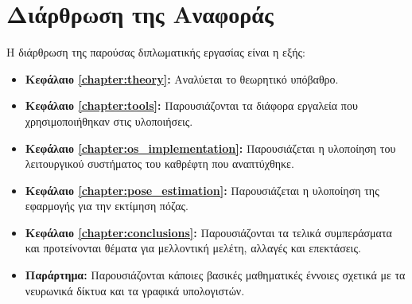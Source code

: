 \section{Διάρθρωση της Αναφοράς}
\label{section:layout}

Η διάρθρωση της παρούσας διπλωματικής εργασίας είναι η εξής:

\begin{itemize}
	\item{\textbf{Κεφάλαιο \ref{chapter:theory}:} Αναλύεται το θεωρητικό υπόβαθρο. 
	}
	\item{\textbf{Κεφάλαιο \ref{chapter:tools}:} Παρουσιάζονται τα διάφορα εργαλεία που χρησιμοποιήθηκαν στις υλοποιήσεις.
	}
	\item{\textbf{Κεφάλαιο \ref{chapter:os_implementation}:} Παρουσιάζεται η υλοποίηση του λειτουργικού συστήματος του καθρέφτη που αναπτύχθηκε.
	}
	\item{\textbf{Κεφάλαιο \ref{chapter:pose_estimation}:} Παρουσιάζεται η υλοποίηση της εφαρμογής για την εκτίμηση πόζας.
	}
	\item{\textbf{Κεφάλαιο \ref{chapter:conclusions}:} Παρουσιάζονται τα τελικά συμπεράσματα και προτείνονται θέματα για μελλοντική μελέτη, αλλαγές και επεκτάσεις.
	}
	\item{\textbf{Παράρτημα:} Παρουσιάζονται κάποιες βασικές μαθηματικές έννοιες σχετικά με τα νευρωνικά δίκτυα και τα γραφικά υπολογιστών.
	}

\end{itemize}

